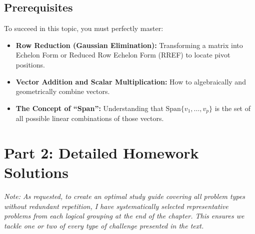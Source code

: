 \documentclass{article}
\begin{document}
\subsection{Prerequisites}
To succeed in this topic, you must perfectly master:
\begin{itemize}
    \item \textbf{Row Reduction (Gaussian Elimination):} Transforming a matrix into Echelon Form or Reduced Row Echelon Form (RREF) to locate pivot positions.
    \item \textbf{Vector Addition and Scalar Multiplication:} How to algebraically and geometrically combine vectors.
    \item \textbf{The Concept of ``Span'':} Understanding that $\text{Span}\{v_1, \dots, v_p\}$ is the set of all possible linear combinations of those vectors.
\end{itemize}

\newpage
\section{Part 2: Detailed Homework Solutions}
\textit{Note: As requested, to create an optimal study guide covering all problem types without redundant repetition, I have systematically selected representative problems from each logical grouping at the end of the chapter. This ensures we tackle one or two of every type of challenge presented in the text.}
\end{document}

